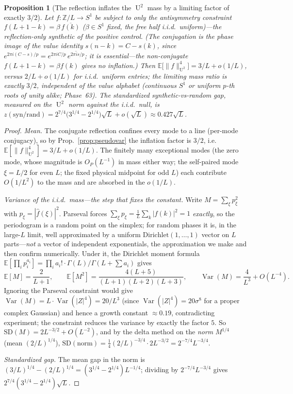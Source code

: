 \documentclass[11pt]{article}
\newtheorem{proposition}{Proposition}
\theoremstyle{definition}
\newcommand{\Z}{\mathbb{Z}}
\DeclareMathOperator{\Uk}{U}
\begin{document}
\begin{proposition}[The reflection inflates the $\Uk^2$ mass by a
limiting factor of exactly $3/2$]\label{prop:scaling}
Let $f\colon\Z/L\to S^1$ be subject to \emph{only} the antisymmetry
constraint $f(L{+}1{-}k)=\beta\,\overline{f(k)}$ ($\beta\in S^1$ fixed, the
free half i.i.d.\ uniform)---the reflection-only synthetic of the
positive control. (The conjugation is the phase image of the value
identity $s(n{-}k)=C-s(k)$, since
$e^{2\pi i(C-s)/p}=e^{2\pi iC/p}\,\overline{e^{2\pi is/p}}$; it is
essential---the non-conjugate $f(L{+}1{-}k)=\beta f(k)$ gives no
inflation.) Then $\mathbb E\big[\|f\|_{\Uk^2}^4\big]=3/L+o(1/L)$,
versus $2/L+o(1/L)$ for i.i.d.\ uniform entries; the limiting mass
ratio is exactly $3/2$, independent of the value alphabet (continuous
$S^1$ or uniform $p$-th roots of unity alike; Phase~63). The
standardized synthetic-vs-random gap, measured on the $\Uk^2$
\emph{norm} against the i.i.d.\ null, is
$z(\mathrm{syn/rand})=2^{7/4}\big(3^{1/4}-2^{1/4}\big)\sqrt L+o(\sqrt L)
\approx0.427\sqrt L$.
\end{proposition}

\begin{proof}
\emph{Mean.} The conjugate reflection confines every mode to a line
(per-mode conjugacy), so by Prop.~\ref{prop:pseudovar} the inflation
factor is $3/2$, i.e.\ $\mathbb E[\|f\|_{\Uk^2}^4]=3/L+o(1/L)$. The
finitely many exceptional
modes (the zero mode, whose magnitude is $O_P(L^{-1})$ in mass either
way; the self-paired mode $\xi=L/2$ for even $L$; the fixed physical
midpoint for odd $L$) each contribute $O(1/L^2)$ to the mass and are
absorbed in the $o(1/L)$.

\emph{Variance of the i.i.d.\ mass---the step that fixes the constant.}
Write $M=\sum_\xi p_\xi^2$ with $p_\xi=|\hat f(\xi)|^2$. Parseval forces
$\sum_\xi p_\xi=\tfrac1L\sum_k|f(k)|^2=1$ \emph{exactly}, so the
periodogram is a random point on the simplex; for random phases it is,
in the large-$L$ limit, well approximated by a uniform
$\mathrm{Dirichlet}(1,\dots,1)$ vector on $L$ parts---\emph{not} a vector
of independent exponentials, the approximation we make and then confirm
numerically. Under it, the Dirichlet moment formula
$\mathbb E[\prod_i p_i^{a_i}]=\prod_i a_i!\cdot\Gamma(L)/\Gamma(L+\sum
a_i)$ gives
\[
\mathbb E[M]=\frac{2}{L+1},\qquad
\mathbb E[M^2]=\frac{4(L+5)}{(L+1)(L+2)(L+3)},\qquad
\operatorname{Var}(M)=\frac{4}{L^3}+O(L^{-4}).
\]
Ignoring the Parseval constraint would give
$\operatorname{Var}(M)=L\cdot\operatorname{Var}(|Z|^4)=20/L^3$ (since
$\operatorname{Var}(|Z|^4)=20\sigma^8$ for a proper complex Gaussian)
and hence a growth constant $\approx0.19$, contradicting experiment; the
constraint reduces the variance by exactly the factor $5$. So
$\mathrm{SD}(M)=2L^{-3/2}+O(L^{-2})$, and by the delta method on the
\emph{norm} $M^{1/4}$ (mean $(2/L)^{1/4}$),
$\mathrm{SD}(\text{norm})=\tfrac14(2/L)^{-3/4}\cdot 2L^{-3/2}
=2^{-7/4}L^{-3/4}$.

\emph{Standardized gap.} The mean gap in the norm is
$(3/L)^{1/4}-(2/L)^{1/4}=(3^{1/4}-2^{1/4})L^{-1/4}$; dividing by
$2^{-7/4}L^{-3/4}$ gives $2^{7/4}(3^{1/4}-2^{1/4})\sqrt L$.
\end{proof}
\end{document}
